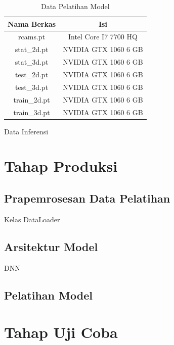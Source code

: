 \begin{table}[htbp]
    \captionsetup{labelfont=bf, textfont=bf}
    \caption{Data Pelatihan Model}
    \label{tab:datapelatihanmodel}
    \vspace{-20pt}
    \begin{center}
        \begin{tabular}{|c|c|}
            \hline
            Nama Berkas  & Isi                   \\ \hline
            rcams.pt     & Intel Core I7 7700 HQ \\ \hline
            stat\_2d.pt  & NVIDIA GTX 1060 6 GB  \\ \hline
            stat\_3d.pt  & NVIDIA GTX 1060 6 GB  \\ \hline
            test\_2d.pt  & NVIDIA GTX 1060 6 GB  \\ \hline
            test\_3d.pt  & NVIDIA GTX 1060 6 GB  \\ \hline
            train\_2d.pt & NVIDIA GTX 1060 6 GB  \\ \hline
            train\_3d.pt & NVIDIA GTX 1060 6 GB  \\ \hline
        \end{tabular}
    \end{center}
\end{table}


Data Inferensi

\section{Tahap Produksi} \label{sec:3-TahapProduksi}

\subsection{Prapemrosesan Data Pelatihan}
Kelas DataLoader

\subsection{Arsitektur Model}
DNN

\subsection{Pelatihan Model}


\section{Tahap Uji Coba} \label{sec:3-TahapUjiCoba}

